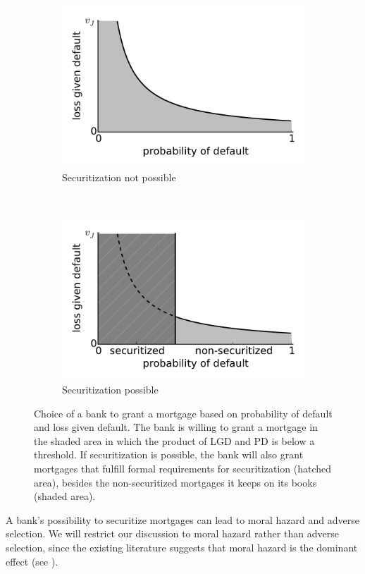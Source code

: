\documentclass[11pt,twopage]{article}
\begin{document}
\begin{figure}
	\begin{center}
		\begin{subfigure}[b]{0.5\textwidth}
			\centering
		\includegraphics[width=\textwidth]{graphics/mortgages-without-securitization-grey}
		\caption{Securitization not possible\label{fig:mortgages-without-securitization}}
\end{subfigure}%
~ %
\begin{subfigure}[b]{0.5\textwidth}
		\centering
		\includegraphics[width=\textwidth]{graphics/mortgages-with-securitization-grey}
		\caption{Securitization possible\label{fig:mortgages-with-securitization}}
\end{subfigure}
\caption{Choice of a bank to grant a mortgage based on probability of default and loss given default. The bank is willing to grant a mortgage in the shaded area in which the product of LGD and PD is below a threshold. If securitization is possible, the bank will also grant mortgages that fulfill formal requirements for securitization (hatched area), besides the non-securitized mortgages it keeps on its books (shaded area).}
	\end{center}
\end{figure}
A bank's possibility to securitize mortgages can lead to moral hazard
and adverse selection. We will restrict our discussion to moral
hazard rather than adverse selection, since the existing literature
suggests that moral hazard is the dominant effect (see \cite{keys2008did}).
\end{document}
